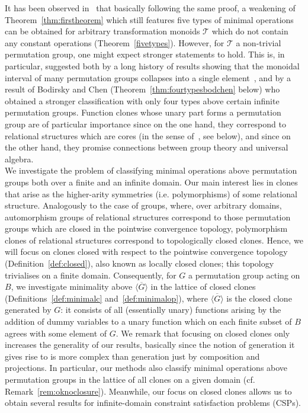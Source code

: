 \documentclass{article}
\theoremstyle{remark}
\theoremstyle{definition}
\begin{document}
It has been observed in~\cite{BodCSP} that basically following the same proof, a weakening of Theorem~\ref{thm:firstheorem} which still features five types of minimal operations can be obtained for arbitrary transformation monoids $\mathcal T$ which do not contain any constant operations (Theorem~\ref{fivetypes}). However, for $\mathcal{T}$ a non-trivial permutation group, one might expect stronger statements to hold. This is, in particular,  suggested both by a long history of results showing that the monoidal interval of many  permutation groups collapses into a single element~\cite{Haddad_Rosenberg_1994,palfy1984unary, palfy1982contributions, kearnes2001collapsing, krokhin1995monoid}, and by a result of Bodirsky and Chen (Theorem~\ref{thm:fourtypesbodchen} below) who obtained a stronger classification with only four types above certain infinite permutation groups. Function clones whose unary part forms a permutation group are of particular importance since on the one hand, they correspond to relational structures which are cores (in the sense of~\cite{hell1992core, bodirsky2007cores}, see below), and since on the other hand, they promise connections  between group theory and universal algebra.\\

We investigate the problem of classifying minimal operations above permutation groups both over a finite and an infinite domain. Our main interest lies in clones that arise as the higher-arity symmetries (i.e. polymorphisms) of some relational structure. Analogously to the case of groups, where, over arbitrary domains, automorphism groups of relational structures correspond to those permutation groups which are closed in the pointwise convergence topology, polymorphism clones of relational structures correspond to  topologically closed clones. Hence, we will focus on clones closed with respect to the pointwise convergence topology (Definition~\ref{def:closed}), also known as locally closed clones; this topology trivialises on a finite domain. Consequently, for  $G$ a permutation group acting on $B$, we investigate minimality above $\overline{\langle G\rangle}$ in the lattice of closed clones (Definitions~\ref{def:minimalc} and~\ref{def:minimalop}), where $\overline{\langle G\rangle}$ is the closed clone generated by $G$: it consists of all (essentially unary) functions arising by the addition of  dummy variables to a unary function 
which on each finite subset of $B$ agrees with some element of $G$. We remark that focusing on closed clones only increases the generality of our results, basically  since the notion of generation it gives rise to is more complex than generation just by composition and projections. In particular, our methods also classify minimal operations above permutation groups in the lattice of all clones on a given domain (cf. Remark~\ref{rem:oknoclosure}). Meanwhile, our focus on closed clones allows us to obtain several results for infinite-domain constraint satisfaction problems (CSPs).\\
\end{document}
